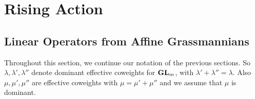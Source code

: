 \documentclass[draft]{article} %
\begin{document}
\begin{comment}
\end{comment}




\section{Rising Action} 
\label{s:rising}

\subsection{Linear Operators from Affine Grassmannians}
\label{s:latticefacts}
% 
Throughout this section, we continue our notation of the previous sections. So $ \lambda, \lambda', \lambda''$ denote dominant effective coweights for $ {\mathbf{GL}}_m$, with $ \lambda' + \lambda'' = \lambda$.  Also $ \mu, \mu', \mu''$ are effective coweights with $ \mu = \mu' + \mu''$ and we assume that $ \mu$ is dominant.
\end{document}
